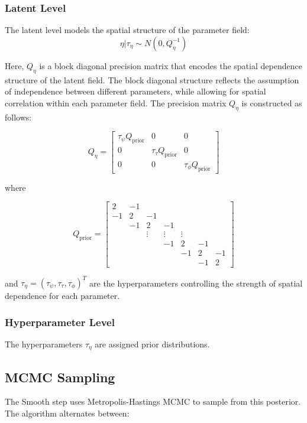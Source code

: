 \documentclass[
  letterpaper,
  DIV=11,
  numbers=noendperiod]{scrartcl}
\begin{document}
\subsubsection{Latent Level}\label{latent-level}

The latent level models the spatial structure of the parameter field: \[
\eta | \tau_\eta \sim N(0, Q_\eta^{-1})
\]

Here, \(Q_\eta\) is a block diagonal precision matrix that encodes the
spatial dependence structure of the latent field. The block diagonal
structure reflects the assumption of independence between different
parameters, while allowing for spatial correlation within each parameter
field. The precision matrix \(Q_\eta\) is constructed as follows:

\[
Q_\eta = \begin{bmatrix}
\tau_\psi Q_{\text{prior}} & 0 & 0 \\
0 & \tau_\tau Q_{\text{prior}} & 0 \\
0 & 0 & \tau_\phi Q_{\text{prior}}
\end{bmatrix}
\]

where

\[
Q_{\text{prior}} = \begin{bmatrix}
2 & -1 \\
-1 & 2 & -1 \\
& -1 & 2 & -1 \\
& & \vdots & \vdots & \vdots \\
& & & -1 & 2 & -1 \\
& & & & -1 & 2 & -1 \\
& & & & & -1 & 2
\end{bmatrix}
\]

and \(\tau_\eta = \left(\tau_\psi, \tau_\tau, \tau_\phi\right)^T\) are
the hyperparameters controlling the strength of spatial dependence for
each parameter.

\subsubsection{Hyperparameter Level}\label{hyperparameter-level}

The hyperparameters \(\tau_\eta\) are assigned prior distributions.

\subsection{MCMC Sampling}\label{mcmc-sampling}

The Smooth step uses Metropolis-Hastings MCMC to sample from this
posterior. The algorithm alternates between:
\end{document}
